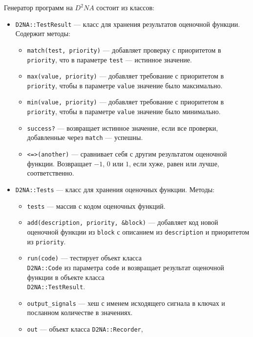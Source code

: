 \documentclass[utf8,a5paper,portrait,10pt]{eskdtext}
\begin{document}
Генератор программ на $D^2NA$ состоит из классов:
\begin{itemize}
  \item \texttt{D2NA::TestResult} — класс для хранения результатов оценочной
        функции. Содержит методы:
        \begin{itemize}
          \item \texttt{match(test, priority)} — добавляет проверку с
                приоритетом в \texttt{priority}, что в параметре \texttt{test} —
                истинное значение.
          \item \texttt{max(value, priority)} — добавляет требование с
                приоритетом в \texttt{priority}, чтобы в параметре
                \texttt{value} значение было максимально.
          \item \texttt{min(value, priority)} — добавляет требование с
                приоритетом в \texttt{priority}, чтобы в параметре
                \texttt{value} значение было минимально.
          \item \texttt{success?} — возвращает истинное значение, если все
                проверки, добавленные через \texttt{match} — успешны.
          \item \texttt{<=>(another)} — сравнивает себя с другим результатом
                оценочной функции. Возвращает $-1$, $0$ или $1$, если хуже,
                равен или лучше, соответственно.
        \end{itemize}
  \item \texttt{D2NA::Tests} — класс для хранения оценочных функции. Методы:
        \begin{itemize}
          \item \texttt{tests} — массив с кодом оценочных функций.
          \item \texttt{add(description, priority, \&block)} — добавляет код
                новой оценочной функции из \texttt{block} с описанием из
                \texttt{description} и приоритетом из \texttt{priority}.
          \item \texttt{run(code)} — тестирует объект класса\\
                \texttt{D2NA::Code} из параметра \texttt{code} и возвращает
                результат оценочной функции в объекте класса\\
                \texttt{D2NA::TestResult}.
          \item \texttt{output\_signals} — хеш с именем исходящего сигнала в
                ключах и посланном количестве в значениях.
          \item \texttt{out} — объект класса \texttt{D2NA::Recorder},

\end{itemize}
\end{itemize}
\end{document}
